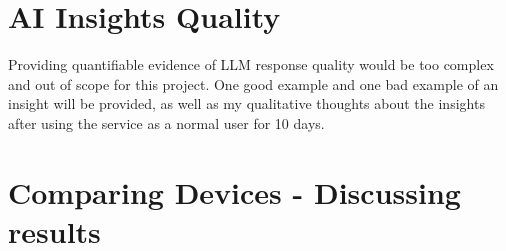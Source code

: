 \section{AI Insights Quality}
Providing quantifiable evidence of LLM response quality would be too complex and out of scope for this project. One good example and one bad example of an insight will be provided, as well as my qualitative thoughts about the insights after using the service as a normal user for 10 days. 
\section{Comparing Devices - Discussing results}
